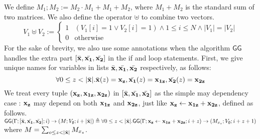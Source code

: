 We define $M_1 ; M_2  :=  M_2 \cdot M_1 + M_1 + M_2 $, where $M_1 + M_2$ is the standard sum of two matrices.
We also define the operator $\uplus$ to combine two vectors.
\[
V_1 \uplus V_2  :=  \left\{
\begin{array}{ll}
1 & (V_1[i] = 1 \lor V_2[i] = 1) \land 1 \leq i \leq N \land |V_1| = |V_2|\\
0 & \mbox{otherwise}
\end{array}\right.
\]
For the sake of brevity, we also use some annotations when the algorithm $\mathsf{GG}$ handles the extra part $[ \bar{{\bf{{x}}}}, \bar{{\bf{{x_1}}}},\bar{{\bf{{x_2}}}} ] $ in the if and loop statements. First, we give unique names for variables in lists $\bar{{\bf{{x}}}}, \bar{{\bf{{x_1}}}}, \bar{{\bf{{x_2}}}}$ respectively, as follows: \[ \forall 0 \leq z < |\bar{{\bf{{x}}}}|. \bar{{\bf{{x}}}}(z) = {\bf{{x_z}}}, \bar{{\bf{{x_1}}}}(z) = {\bf{{x_{1z}}}}, \bar{{\bf{{x_2}}}}(z) = {\bf{{x_{2z}}}} \]
We treat every tuple $({\bf{{x_z}}},{\bf{{x_{1z}}}},{\bf{{x_{2z}}}} )$ in $[\bar{{\bf{{x}}}}, \bar{{\bf{{x_1}}}}, \bar{{\bf{{x_2}}}} ]$ as the simple may dependency case : ${\bf{{x_z}}}$ may depend on both $ {\bf{{x_{1z}}}}$ and ${\bf{{x_{2z}}}}$, just like $ \mathrel{ {\bf{{x_z}}}  \leftarrow {\bf{{x_{1z}}}} + {\bf{{x_{2z}}}}  }$, defined as follows.\\ 
$
 \mathsf{GG}{(\Gamma; [\bar{{\bf{{x}}}}, \bar{{\bf{{x_1}}}}, \bar{{\bf{{x_2}}}} ] ; i )}\to {( M; V_{\emptyset}; i + |\bar{{\bf{{x}}}}| )} 
  \triangleq { \forall 0 \leq z < |\bar{{\bf{{x}}}}|.
  \mathsf{GG}{(\Gamma; \mathrel{ {\bf{{x_z}}}  \leftarrow {\bf{{x_{1z}}}} + {\bf{{x_{2z}}}}  } ; i+z )}\to {( M_{x_z};  V_{\emptyset}; i+z+1)} }$
   where $M = \sum_{o \leq z < |\bar{{\bf{{x}}}}| }M_{x_z} $.
%
